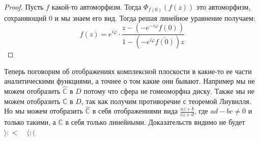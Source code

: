 \documentclass[12pt,a4paper]{article} %
\newcommand{\Co}{\mathbb{C}}
\begin{document}
	\begin{proof}
		Пусть $f$ какой-то автоморфизм. Тогда $\Phi_{f(0)}(f(z))$ это автоморфизм, сохраняющий 0 и мы знаем его вид. Тогда решая линейное уравнение получаем:
		$$f(z)=e^{i\varphi}\displaystyle\cdot\frac{z-(-e^{-i\varphi}f(0))}{1-(-e^{i\varphi}\overline{f(0)})z}$$
	\end{proof}
	Теперь поговорим об отображениях комплексной плоскости в какие-то ее части аналитическими функциями, а точнее о том какие они бывают. Например мы не можем отобразить $\widehat{\Co}$ в $D$ потому что сфера не гомеоморфна диску. Также мы не можем отобразить $\Co$ в $D$, так как получим противоречие с теоремой Лиувилля. Но мы можем отобразить $\widehat{\Co}$ в себя отображениями вида $\displaystyle\frac{az+b}{cz+d}$, где $ad-bc\neq 0$ и только такими, а $\Co$ в себя только линейными. Доказательств видимо не будет $\rangle:<\quad \langle:($
\end{document}
